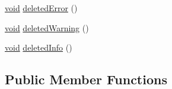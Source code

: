 \begin{DoxyCompactItemize}
\item 
\hyperlink{group___u_a_v_objects_plugin_ga444cf2ff3f0ecbe028adce838d373f5c}{void} \hyperlink{group___core_plugin_gae1c36dd9dd0467e3ca267b646a995c6f}{deleted\-Error} ()
\item 
\hyperlink{group___u_a_v_objects_plugin_ga444cf2ff3f0ecbe028adce838d373f5c}{void} \hyperlink{group___core_plugin_gabee55cc28f8b283a56070361824df749}{deleted\-Warning} ()
\item 
\hyperlink{group___u_a_v_objects_plugin_ga444cf2ff3f0ecbe028adce838d373f5c}{void} \hyperlink{group___core_plugin_ga70309ce7fad88a9fcf38589659e511eb}{deleted\-Info} ()
\end{DoxyCompactItemize}
\subsection*{\-Public \-Member \-Functions}

